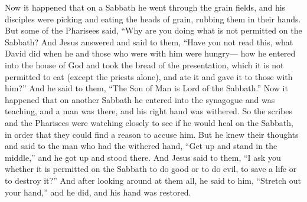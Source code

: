 \begin{biblechapter} %
 Now it happened that on a Sabbath he went through the grain fields, and his disciples were picking and eating the heads of grain, rubbing them in their hands.
\verse But some of the Pharisees said, “Why are you doing what is not permitted on the Sabbath?
\verse And Jesus answered and said to them, “Have you not read this, what David did when he and those who were with him were hungry—
\verse how he entered into the house of God and took the bread of the presentation, which it is not permitted to eat (except the priests alone), and ate it and gave it to those with him?”
\verse And he said to them, “The Son of Man is Lord of the Sabbath.”
 Now it happened that on another Sabbath he entered into the synagogue and was teaching, and a man was there, and his right hand was withered.
\verse So the scribes and the Pharisees were watching closely to see if he would heal on the Sabbath, in order that they could find a reason to accuse him.
\verse But he knew their thoughts and said to the man who had the withered hand, “Get up and stand in the middle,” and he got up and stood there.
\verse And Jesus said to them, “I ask you whether it is permitted on the Sabbath to do good or to do evil, to save a life or to destroy it?”
\verse And after looking around at them all, he said to him, “Stretch out your hand,” and he did, and his hand was restored.

\end{biblechapter}

